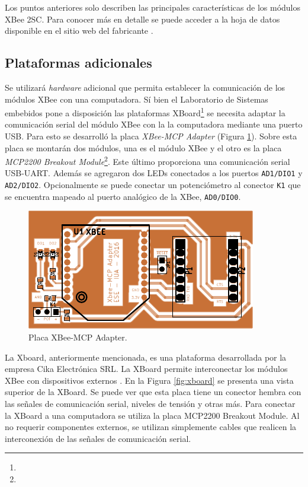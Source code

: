 \documentclass[11pt,oneside,spanish,a4paper]{article}
\begin{document}
Los puntos anteriores solo describen las principales características
de los módulos XBee 2SC. Para conocer más en detalle se puede acceder
a la hoja de datos disponible en el sitio web del fabricante
\cite{s2c-ds}.

\subsection{Plataformas adicionales}
\label{sec:plat}

Se utilizará \textsl{hardware} adicional que permita establecer la
comunicación de los módulos XBee con una computadora. Sí bien el
Laboratorio de Sistemas embebidos pone a disposición las plataformas
XBoard\footnote{}
se necesita adaptar la comunicación serial del módulo XBee con la la
computadora mediante una puerto USB. Para esto se desarrolló la placa
\emph{XBee-MCP Adapter} (Figura \ref{fig:xb-mcp-adap}). Sobre esta
placa se montarán dos módulos, una es el módulo XBee y el otro es la
placa \emph{MCP2200 Breakout
  Module}\footnote{}. Este
último proporciona una comunicación serial USB-UART. 
Además se agregaron dos LEDs conectados a los puertos
\texttt{AD1/DIO1} y \texttt{AD2/DIO2}. Opcionalmente se puede conectar
un potenciómetro al conector \texttt{K1} que se encuentra mapeado al
puerto analógico de la XBee, \texttt{AD0/DIO0}.

\begin{figure}[ht]
  \centering
  \includegraphics{img/xb-mcp-adapter}
  \caption{Placa XBee-MCP Adapter.}
  \label{fig:xb-mcp-adap}
\end{figure}

La Xboard, anteriormente mencionada, es una plataforma desarrollada
por la empresa Cika Electrónica SRL. La XBoard permite interconectar
los módulos XBee con dispositivos externos \cite{xboard}. En la Figura
\ref{fig:xboard} se presenta una vista superior de la XBoard. Se puede
ver que esta placa tiene un conector hembra con las señales de
comunicación serial, niveles de tensión y otras más. Para conectar la
XBoard a una computadora se utiliza la placa MCP2200 Breakout
Module. Al no requerir componentes externos, se utilizan simplemente
cables que realicen la interconexión de las señales de comunicación
serial.
\end{document}
